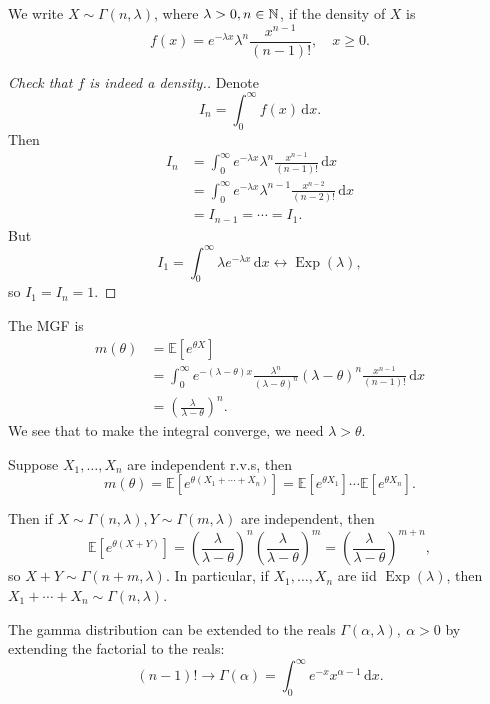 \begin{example}
    We write $ X \sim \Gamma(n,\lambda) $, where $ \lambda>0, n\in {\mathbb{N}} $, if the density of $X$ is 
    \[
        f(x)=e^{-\lambda x}\lambda^n\frac{x^{n-1}}{(n-1)!},\quad x\ge 0.
    \]
    \begin{proof}[Check that $f$ is indeed a density.]
        Denote 
        \[
            I_n = \int_{0}^{\infty} f(x) \,\mathrm{d}x.
        \]
        Then 
        \begin{align*}
            I_n &= \int_{0}^{\infty} e^{-\lambda x}\lambda^n\frac{x^{n-1}}{(n-1)!} \,\mathrm{d}x\\ 
            &= \int_{0}^{\infty} e^{-\lambda x}\lambda^{n-1}\frac{x^{n-2}}{(n-2)!} \,\mathrm{d}x\\ 
            &= I_{n-1}=\cdots = I_1.
        \end{align*}
        But 
        \[
            I_1 = \int_{0}^{\infty} \lambda e^{-\lambda x} \,\mathrm{d}x \leftrightarrow \operatorname{Exp}(\lambda),
        \]
        so $I_1=I_n=1$. 
    \end{proof}
    
    The MGF is 
    \begin{align*}
        m(\theta)&=\mathbb E[e^{\theta X}]\\
        &=\int_0^\infty e^{-(\lambda-\theta)x}\frac{\lambda^n}{(\lambda-\theta)^n}(\lambda-\theta)^n\frac{x^{n-1}}{(n-1)!}\,\mathrm dx\\
        &=\left(\frac{\lambda}{\lambda-\theta} \right)^n.
    \end{align*}
    We see that to make the integral converge, we need $ \lambda>\theta $.

    \begin{claim}
        Suppose $ X_1,\dots,X_n $ are independent r.v.s, then 
        \[
            m(\theta)=\mathbb E[e^{\theta(X_1+\cdots+X_n)}]=\mathbb E[e^{\theta X_1}]\cdots\mathbb E[e^{\theta X_n}].
        \]
    \end{claim}

    Then if $X\sim\Gamma(n,\lambda),Y\sim\Gamma(m,\lambda)$ are independent, then
    \[
        \mathbb E[e^{\theta(X+Y)}]=\left(\frac{\lambda}{\lambda-\theta} \right)^n\left(\frac{\lambda}{\lambda-\theta} \right)^m=\left(\frac{\lambda}{\lambda-\theta} \right)^{m+n},
    \]
    so $ X+Y \sim \Gamma(n+m,\lambda) $.
    In particular, if $X_1,\ldots,X_n$ are iid $\operatorname{Exp}(\lambda)$, then $X_1+\cdots+X_n\sim\Gamma(n,\lambda)$.

    The gamma distribution can be extended to the reals $ \Gamma(\alpha,\lambda),\ \alpha>0 $ by extending the factorial to the reals:
    \[
        (n-1)! \longrightarrow \Gamma(\alpha) = \int_{0}^{\infty} e^{-x}x^{\alpha-1} \,\mathrm{d}x.
    \]
\end{example}

